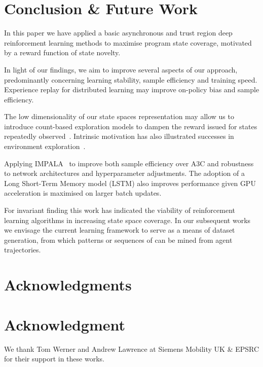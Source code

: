 \documentclass[conference,compsoc]{IEEEtran}
\begin{document}
\section{Conclusion \& Future Work } 
In this paper we have applied a basic asynchronous and trust region deep reinforcement learning methods to maximise program state coverage, motivated by a reward function of state novelty.  

In light of our findings, we aim to improve several aspects of our approach, predominantly concerning learning stability, sample efficiency and training speed. Experience replay for distributed learning may improve on-policy bias and sample efficiency. 

The low dimensionality of our state spaces representation may allow us to introduce count-based exploration models to dampen the reward issued for states repeatedly observed~\cite{ostrovski2017countbased}. Intrinsic motivation has also illustrated successes in environment exploration~\cite{houthooft2017vime}.

Applying IMPALA~\cite{espeholt2018impala} to improve both sample efficiency over A3C and robustness to network architectures and hyperparameter adjustments. The adoption of a Long Short-Term Memory model (LSTM) also improves performance given GPU acceleration is maximised on larger batch updates.

For invariant finding this work has indicated the viability of reinforcement learning algorithms in increasing state space coverage. In our subsequent works we envisage the current learning framework to serve as a means of dataset generation, from which patterns or sequences of can be mined from agent trajectories.





\ifCLASSOPTIONcompsoc
  \section*{Acknowledgments}
\else
  \section*{Acknowledgment}
\fi
We thank Tom Werner and Andrew Lawrence at Siemens Mobility UK \& EPSRC for their support in these works.
\end{document}
